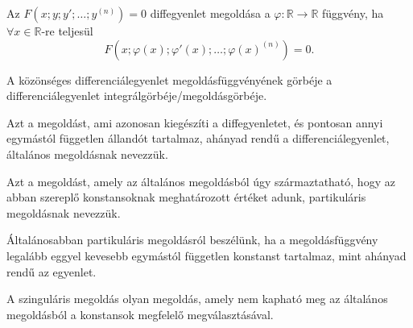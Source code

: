 \documentclass[main.tex]{subfiles}
\begin{document}

Az $F \left( x ; y ; y' ; \dots ; y^{(n)} \right) = 0$
diffegyenlet megoldása a
$\varphi : \mathbb{R} \rightarrow \mathbb{R}$
függvény, ha $\forall x \in \mathbb{R}$-re teljesül
\begin{equation*}
  F \left( x ; \varphi(x) ; \varphi'(x) ; \dots ; \varphi(x)^{(n)} \right) = 0.
\end{equation*}







A közönséges differenciálegyenlet megoldásfüggvényének
görbéje a differenciálegyenlet integrálgörbéje/megoldásgörbéje.





Azt a megoldást, ami azonosan kiegészíti a diffegyenletet,
és pontosan annyi egymástól független állandót tartalmaz,
ahányad rendű a differenciálegyenlet, általános megoldásnak
nevezzük.





Azt a megoldást, amely az általános megoldásból úgy származtatható,
hogy az abban szereplő konstansoknak meghatározott értéket adunk,
partikuláris megoldásnak nevezzük.

\vspace{.33em}
Általánosabban partikuláris megoldásról beszélünk, ha a
megoldásfüggvény legalább eggyel kevesebb egymástól
független konstanst tartalmaz, mint ahányad rendű az egyenlet.





A szinguláris megoldás olyan megoldás,
amely nem kapható meg az általános megoldásból
a konstansok megfelelő megválasztásával.



\end{document}
